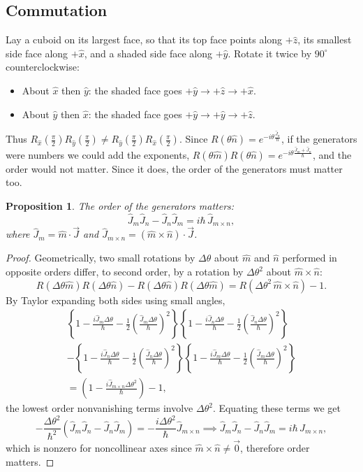 \documentclass{article}
\newtheorem{proposition}{Proposition}
\begin{document}
\subsection{Commutation}
Lay a cuboid on its largest face, so that its top face points along $+\hat{z}$, its smallest side face along $+\hat{x}$, and a shaded side face along $+\hat{y}$. Rotate it twice by $90^\circ$ counterclockwise:
\begin{itemize}
    \item About $\hat{x}$ then $\hat{y}$: the shaded face goes $+\hat{y} \to +\hat{z} \to +\hat{x}$.
    \item About $\hat{y}$ then $\hat{x}$: the shaded face goes $+\hat{y} \to +\hat{y} \to +\hat{z}$.
\end{itemize}
Thus $R_{\hat{x}}(\frac{\pi}{2})R_{\hat{y}}(\frac{\pi}{2}) \neq R_{\hat{y}}(\frac{\pi}{2})R_{\hat{x}}(\frac{\pi}{2})$. Since $R(\theta\hat{n}) = e^{-i\theta\frac{\hat{J}_n}{\hbar}}$, if the generators were numbers we could add the exponents, $R(\theta\hat{m})R(\theta\hat{n}) = e^{-i\theta\frac{\hat{J}_m + \hat{J}_n}{\hbar}}$, and the order would not matter. Since it does, the order of the generators must matter too.
\begin{proposition}
    The order of the generators matters:
    \begin{equation*}
        \hat{J}_m\hat{J}_n - \hat{J}_n\hat{J}_m = i\hbar\,\hat{J}_{m\times n},
    \end{equation*}
    where $\hat{J}_m = \hat{m}\cdot\vec{J}$ and $\hat{J}_{m\times n} = (\hat{m}\times\hat{n})\cdot\vec{J}$.
\end{proposition}
\begin{proof}
    Geometrically, two small rotations by $\Delta\theta$ about $\hat{m}$ and $\hat{n}$ performed in opposite orders differ, to second order, by a rotation by $\Delta\theta^2$ about $\hat{m}\times\hat{n}$:
    \[R(\Delta\theta\hat{m})R(\Delta\theta\hat{n}) - R(\Delta\theta\hat{n})R(\Delta\theta\hat{m}) = R(\Delta\theta^2\,\hat{m}\times\hat{n}) - 1.\]
    By Taylor expanding both sides using small angles,
    \begin{multline*}
        \left\{1-\frac{i\hat{J}_m\Delta\theta}{\hbar}-\frac{1}{2}\left(\frac{\hat{J}_m\Delta\theta}{\hbar}\right)^2\right\}\left\{1-\frac{i\hat{J}_n\Delta\theta}{\hbar}-\frac{1}{2}\left(\frac{\hat{J}_n\Delta\theta}{\hbar}\right)^2\right\} \\
        -\left\{1-\frac{i\hat{J}_n\Delta\theta}{\hbar}-\frac{1}{2}\left(\frac{\hat{J}_n\Delta\theta}{\hbar}\right)^2\right\}\left\{1-\frac{i\hat{J}_m\Delta\theta}{\hbar}-\frac{1}{2}\left(\frac{\hat{J}_m\Delta\theta}{\hbar}\right)^2\right\} \\
        = \left(1-\frac{i\hat{J}_{m\times n}\Delta\theta^2}{\hbar}\right)-1,
    \end{multline*}
    the lowest order nonvanishing terms involve $\Delta\theta^2$. Equating these terms we get
    \[-\frac{\Delta\theta^2}{\hbar^2}\left(\hat{J}_m\hat{J}_n - \hat{J}_n\hat{J}_m\right) = -\frac{i\Delta\theta^2}{\hbar}\hat{J}_{m\times n} \implies \hat{J}_m\hat{J}_n - \hat{J}_n\hat{J}_m = i\hbar\,\hat{J}_{m\times n},\]
    which is nonzero for noncollinear axes since $\hat{m}\times\hat{n} \neq \vec{0}$, therefore order matters.
\end{proof}
\end{document}
